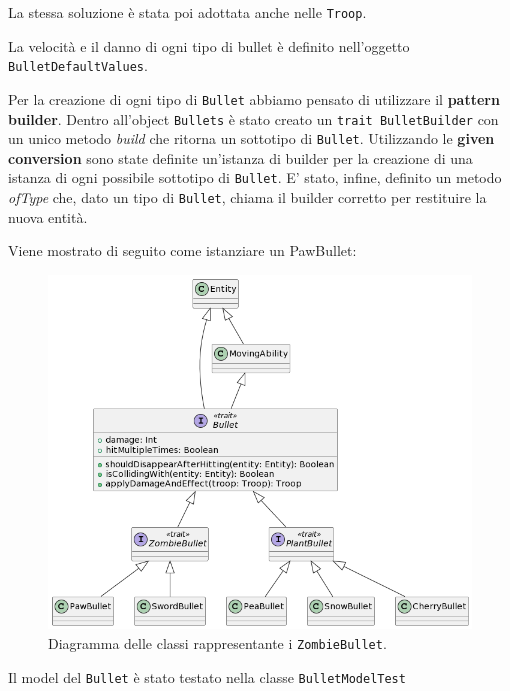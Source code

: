 



La stessa soluzione è stata poi adottata anche nelle \texttt{Troop}.

La velocità e il danno di ogni tipo di bullet è definito nell'oggetto \texttt{BulletDefaultValues}.

Per la creazione di ogni tipo di \texttt{Bullet} abbiamo pensato di utilizzare il \textbf{pattern builder}.
Dentro all'object \texttt{Bullets} è stato creato un \texttt{trait BulletBuilder}
con un unico metodo \textit{build} che ritorna un sottotipo di \texttt{Bullet}.
Utilizzando le \textbf{given conversion} sono state definite un'istanza di builder per la creazione di una istanza
di ogni possibile sottotipo di \texttt{Bullet}.
E' stato, infine, definito un metodo \textit{ofType} che, dato un tipo
di \texttt{Bullet}, chiama il builder corretto per restituire la nuova entità.



Viene mostrato di seguito come istanziare un PawBullet:



\begin{figure}[H]
    \centering
    \includegraphics[width=1\linewidth]{images/model-bullet}
    \caption{Diagramma delle classi rappresentante i \texttt{ZombieBullet}.}
    \label{fig:class-bullet}
\end{figure}

Il model del \texttt{Bullet} è stato testato nella classe \texttt{BulletModelTest}

